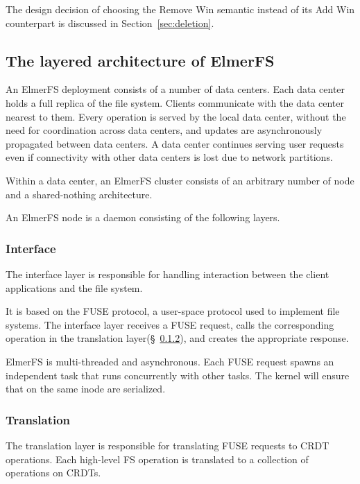 \documentclass[sigconf, 10pt]{acmart}
\begin{document}
The design decision of choosing the Remove Win semantic instead of its Add Win counterpart is discussed in Section~\ref{sec:deletion}.

\subsection{The layered architecture of ElmerFS}

An ElmerFS deployment consists of a number of data centers.
Each data center holds a full replica of the file system.
Clients communicate with the data center nearest to them.
Every operation is served by the local data center, without the need
for coordination across data centers,
and updates are asynchronously propagated between data centers.
A data center continues serving user requests even if connectivity
with other data centers is lost due to network partitions.

Within a data center, an ElmerFS cluster consists of an arbitrary number
of node and a shared-nothing architecture.

An ElmerFS node is a daemon consisting of the following layers.

\subsubsection{Interface}

The interface layer is responsible for handling interaction between the client applications
and the file system.

It is based on the FUSE protocol, a user-space protocol used to implement
file systems. The interface layer receives a FUSE request, calls the corresponding operation in the translation layer(\S~\ref{sec:transaction_layer}), and creates the appropriate response.

ElmerFS is multi-threaded and asynchronous. Each FUSE request spawns an independent task that runs concurrently with other tasks. The kernel will ensure that on the same inode
are serialized.

\subsubsection{Translation}
\label{sec:transaction_layer}
The translation layer is responsible for translating FUSE requests
to CRDT operations. Each high-level FS operation is translated
to a collection of operations on CRDTs.
\end{document}
